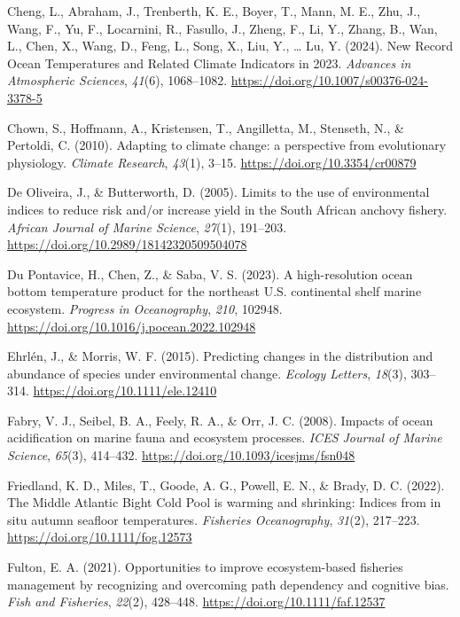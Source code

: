 \documentclass[
  12pt,
]{article}
\newlength{\cslhangindent}
\newenvironment{CSLReferences}[2] %
 {\begin{list}{}{%
  \setlength{\itemindent}{0pt}
  \setlength{\leftmargin}{0pt}
  \setlength{\parsep}{0pt}
  \ifodd #1
   \setlength{\leftmargin}{\cslhangindent}
   \setlength{\itemindent}{-1\cslhangindent}
  \fi
  \setlength{\itemsep}{#2\baselineskip}}}
 {\end{list}}
\begin{document}
\begin{CSLReferences}{1}{2}
Cheng, L., Abraham, J., Trenberth, K. E., Boyer, T., Mann, M. E., Zhu, J., Wang, F., Yu, F., Locarnini, R., Fasullo, J., Zheng, F., Li, Y., Zhang, B., Wan, L., Chen, X., Wang, D., Feng, L., Song, X., Liu, Y., \ldots{} Lu, Y. (2024). New Record Ocean Temperatures and Related Climate Indicators in 2023. \emph{Advances in Atmospheric Sciences}, \emph{41}(6), 1068--1082. \url{https://doi.org/10.1007/s00376-024-3378-5}

Chown, S., Hoffmann, A., Kristensen, T., Angilletta, M., Stenseth, N., \& Pertoldi, C. (2010). Adapting to climate change: a perspective from evolutionary physiology. \emph{Climate Research}, \emph{43}(1), 3--15. \url{https://doi.org/10.3354/cr00879}

De Oliveira, J., \& Butterworth, D. (2005). Limits to the use of environmental indices to reduce risk and/or increase yield in the {South African} anchovy fishery. \emph{African Journal of Marine Science}, \emph{27}(1), 191--203. \url{https://doi.org/10.2989/18142320509504078}

Du Pontavice, H., Chen, Z., \& Saba, V. S. (2023). A high-resolution ocean bottom temperature product for the northeast U.S. continental shelf marine ecosystem. \emph{Progress in Oceanography}, \emph{210}, 102948. \url{https://doi.org/10.1016/j.pocean.2022.102948}

Ehrlén, J., \& Morris, W. F. (2015). Predicting changes in the distribution and abundance of species under environmental change. \emph{Ecology Letters}, \emph{18}(3), 303--314. \url{https://doi.org/10.1111/ele.12410}

Fabry, V. J., Seibel, B. A., Feely, R. A., \& Orr, J. C. (2008). Impacts of ocean acidification on marine fauna and ecosystem processes. \emph{ICES Journal of Marine Science}, \emph{65}(3), 414--432. \url{https://doi.org/10.1093/icesjms/fsn048}

Friedland, K. D., Miles, T., Goode, A. G., Powell, E. N., \& Brady, D. C. (2022). The Middle Atlantic Bight Cold Pool is warming and shrinking: Indices from in situ autumn seafloor temperatures. \emph{Fisheries Oceanography}, \emph{31}(2), 217--223. \url{https://doi.org/10.1111/fog.12573}

Fulton, E. A. (2021). Opportunities to improve ecosystem{-}based fisheries management by recognizing and overcoming path dependency and cognitive bias. \emph{Fish and Fisheries}, \emph{22}(2), 428--448. \url{https://doi.org/10.1111/faf.12537}


\end{CSLReferences}
\end{document}
